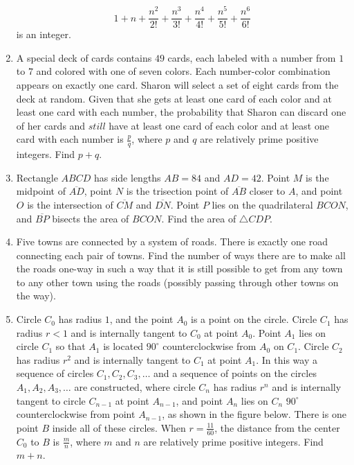 \documentclass{article}
\begin{document}
\begin{enumerate}[label=\arabic*., itemsep=0.5em]
\begin{equation*}
1+n+\frac{n^2}{2!}+\frac{n^3}{3!}+\frac{n^4}{4!}+\frac{n^5}{5!}+\frac{n^6}{6!}
\end{equation*}
 is an integer.\par \vspace{0.5em}\item A special deck of cards contains $49$ cards, each labeled with a number from $1$ to $7$ and colored with one of seven colors. Each number-color combination appears on exactly one card. Sharon will select a set of eight cards from the deck at random. Given that she gets at least one card of each color and at least one card with each number, the probability that Sharon can discard one of her cards and $\textit{still}$ have at least one card of each color and at least one card with each number is $\frac{p}{q}$, where $p$ and $q$ are relatively prime positive integers. Find $p+q$.\par \vspace{0.5em}\item Rectangle $ABCD$ has side lengths $AB=84$ and $AD=42$. Point $M$ is the midpoint of $\overline{AD}$, point $N$ is the trisection point of $\overline{AB}$ closer to $A$, and point $O$ is the intersection of $\overline{CM}$ and $\overline{DN}$. Point $P$ lies on the quadrilateral $BCON$, and $\overline{BP}$ bisects the area of $BCON$. Find the area of $\triangle CDP$.\par \vspace{0.5em}\item Five towns are connected by a system of roads. There is exactly one road connecting each pair of towns. Find the number of ways there are to make all the roads one-way in such a way that it is still possible to get from any town to any other town using the roads (possibly passing through other towns on the way).\par \vspace{0.5em}\item Circle $C_0$ has radius $1$, and the point $A_0$ is a point on the circle. Circle $C_1$ has radius $r<1$ and is internally tangent to $C_0$ at point $A_0$. Point $A_1$ lies on circle $C_1$ so that $A_1$ is located $90^{\circ}$ counterclockwise from $A_0$ on $C_1$. Circle $C_2$ has radius $r^2$ and is internally tangent to $C_1$ at point $A_1$. In this way a sequence of circles $C_1,C_2,C_3,\ldots$ and a sequence of points on the circles $A_1,A_2,A_3,\ldots$ are constructed, where circle $C_n$ has radius $r^n$ and is internally tangent to circle $C_{n-1}$ at point $A_{n-1}$, and point $A_n$ lies on $C_n$ $90^{\circ}$ counterclockwise from point $A_{n-1}$, as shown in the figure below. There is one point $B$ inside all of these circles. When $r = \frac{11}{60}$, the distance from the center $C_0$ to $B$ is $\frac{m}{n}$, where $m$ and $n$ are relatively prime positive integers. Find $m+n$.



\end{enumerate}
\end{document}
